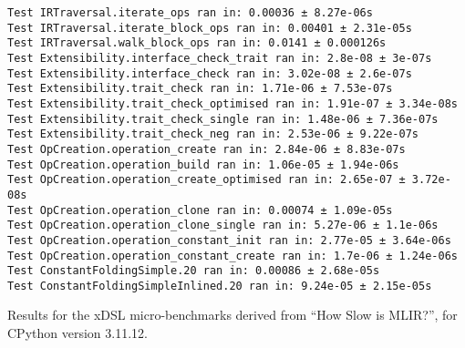 \begin{code}
    \begin{verbatim}
Test IRTraversal.iterate_ops ran in: 0.00036 ± 8.27e-06s
Test IRTraversal.iterate_block_ops ran in: 0.00401 ± 2.31e-05s
Test IRTraversal.walk_block_ops ran in: 0.0141 ± 0.000126s
Test Extensibility.interface_check_trait ran in: 2.8e-08 ± 3e-07s
Test Extensibility.interface_check ran in: 3.02e-08 ± 2.6e-07s
Test Extensibility.trait_check ran in: 1.71e-06 ± 7.53e-07s
Test Extensibility.trait_check_optimised ran in: 1.91e-07 ± 3.34e-08s
Test Extensibility.trait_check_single ran in: 1.48e-06 ± 7.36e-07s
Test Extensibility.trait_check_neg ran in: 2.53e-06 ± 9.22e-07s
Test OpCreation.operation_create ran in: 2.84e-06 ± 8.83e-07s
Test OpCreation.operation_build ran in: 1.06e-05 ± 1.94e-06s
Test OpCreation.operation_create_optimised ran in: 2.65e-07 ± 3.72e-08s
Test OpCreation.operation_clone ran in: 0.00074 ± 1.09e-05s
Test OpCreation.operation_clone_single ran in: 5.27e-06 ± 1.1e-06s
Test OpCreation.operation_constant_init ran in: 2.77e-05 ± 3.64e-06s
Test OpCreation.operation_constant_create ran in: 1.7e-06 ± 1.24e-06s
Test ConstantFoldingSimple.20 ran in: 0.00086 ± 2.68e-05s
Test ConstantFoldingSimpleInlined.20 ran in: 9.24e-05 ± 2.15e-05s
    \end{verbatim}
    \caption{Results for the xDSL micro-benchmarks derived from ``How Slow is MLIR?'', for CPython version 3.11.12.}
    \label{listing:how-slow-is-mlir-xdsl-microbenchmark-results-311}
\end{code}



